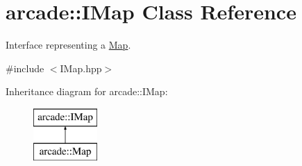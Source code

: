 \hypertarget{classarcade_1_1_i_map}{}\section{arcade\+:\+:I\+Map Class Reference}
\label{classarcade_1_1_i_map}


Interface representing a \hyperlink{classarcade_1_1_map}{Map}.  




{\ttfamily \#include $<$I\+Map.\+hpp$>$}

Inheritance diagram for arcade\+:\+:I\+Map\+:\begin{figure}[H]
\begin{center}
\leavevmode
\includegraphics[height=2.000000cm]{classarcade_1_1_i_map}
\end{center}
\end{figure}
